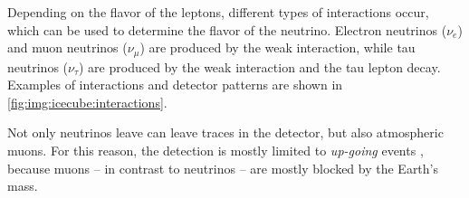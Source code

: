 

Depending on the flavor of the leptons,
  different types of interactions occur,
  which can be used to determine the flavor of the neutrino.
Electron neutrinos ($\nu_e$) and muon neutrinos ($\nu_\mu$) are produced by the weak interaction,
  while tau neutrinos ($\nu_\tau$) are produced by the weak interaction
  and the tau lepton decay.
Examples of interactions and detector patterns are shown in \autoref{fig:img:icecube:interactions}.

 \label{sec:neutrino_astronomy:icecube:up_going}
Not only neutrinos leave can leave traces in the detector, %
  but also atmospheric muons.
For this reason,
  the detection is mostly limited to \emph{up-going} events \cite{icecube_aartsen},
    because muons
      – in contrast to neutrinos –
    are mostly blocked by the Earth's mass.




